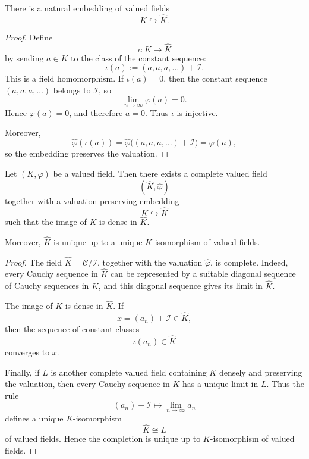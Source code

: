 \begin{proposition}
    There is a natural embedding of valued fields
    \[
        K\hookrightarrow \widehat{K}.
    \]
\end{proposition}

\begin{proof}
    Define
    \[
        \iota:K\longrightarrow \widehat{K}
    \]
    by sending \(a\in K\) to the class of the constant sequence:
    \[
        \iota(a):=(a,a,a,\dots)+\mathcal{I}.
    \]
    This is a field homomorphism. If \(\iota(a)=0\), then the constant sequence
    \((a,a,a,\dots)\) belongs to \(\mathcal{I}\), so
    \[
        \lim_{n\to\infty}\varphi(a)=0.
    \]
    Hence \(\varphi(a)=0\), and therefore \(a=0\). Thus \(\iota\) is injective.

    Moreover,
    \[
        \widehat{\varphi}(\iota(a))
        =
        \widehat{\varphi}\bigl((a,a,a,\dots)+\mathcal{I}\bigr)
        =
        \varphi(a),
    \]
    so the embedding preserves the valuation.
\end{proof}

\begin{theorem}
    Let \((K,\varphi)\) be a valued field. Then there exists a complete valued field
    \[
        (\widehat{K},\widehat{\varphi})
    \]
    together with a valuation-preserving embedding
    \[
        K\hookrightarrow \widehat{K}
    \]
    such that the image of \(K\) is dense in \(\widehat{K}\).

    Moreover, \(\widehat{K}\) is unique up to a unique \(K\)-isomorphism of valued
    fields.
\end{theorem}

\begin{proof}
    The field \(\widehat{K}=\mathcal{C}/\mathcal{I}\), together with the valuation
    \(\widehat{\varphi}\), is complete. Indeed, every Cauchy sequence in
    \(\widehat{K}\) can be represented by a suitable diagonal sequence of Cauchy
    sequences in \(K\), and this diagonal sequence gives its limit in
    \(\widehat{K}\).

    The image of \(K\) is dense in \(\widehat{K}\). If
    \[
        x=(a_n)+\mathcal{I}\in \widehat{K},
    \]
    then the sequence of constant classes
    \[
        \iota(a_n)\in \widehat{K}
    \]
    converges to \(x\).

    Finally, if \(L\) is another complete valued field containing \(K\) densely and
    preserving the valuation, then every Cauchy sequence in \(K\) has a unique limit
    in \(L\). Thus the rule
    \[
        (a_n)+\mathcal{I}
        \longmapsto
        \lim_{n\to\infty}a_n
    \]
    defines a unique \(K\)-isomorphism
    \[
        \widehat{K}\cong L
    \]
    of valued fields. Hence the completion is unique up to \(K\)-isomorphism of
    valued fields.
\end{proof}  
